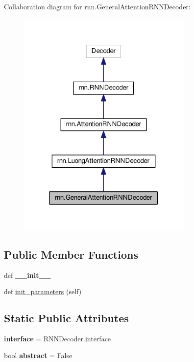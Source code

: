 Collaboration diagram for rnn.\+General\+Attention\+R\+N\+N\+Decoder\+:
\nopagebreak
\begin{figure}[H]
\begin{center}
\leavevmode
\includegraphics[width=245pt]{classrnn_1_1GeneralAttentionRNNDecoder__coll__graph}
\end{center}
\end{figure}
\subsection*{Public Member Functions}
\begin{DoxyCompactItemize}
\item 
def {\bfseries \+\_\+\+\_\+init\+\_\+\+\_\+}\hypertarget{classrnn_1_1GeneralAttentionRNNDecoder_ab29146b7be0f310e74af03e63fee5a0d}{}\label{classrnn_1_1GeneralAttentionRNNDecoder_ab29146b7be0f310e74af03e63fee5a0d}

\item 
def \hyperlink{classrnn_1_1GeneralAttentionRNNDecoder_a396d1ccba6f18aaadfb8cda1a8c2da95}{init\+\_\+parameters} (self)
\end{DoxyCompactItemize}
\subsection*{Static Public Attributes}
\begin{DoxyCompactItemize}
\item 
{\bfseries interface} = R\+N\+N\+Decoder.\+interface\hypertarget{classrnn_1_1GeneralAttentionRNNDecoder_aa2bca36c8dbcd5fa484c57327ccab46c}{}\label{classrnn_1_1GeneralAttentionRNNDecoder_aa2bca36c8dbcd5fa484c57327ccab46c}

\item 
bool {\bfseries abstract} = False\hypertarget{classrnn_1_1GeneralAttentionRNNDecoder_a3047fe7f55a476f80b964747c2dcf0b4}{}\label{classrnn_1_1GeneralAttentionRNNDecoder_a3047fe7f55a476f80b964747c2dcf0b4}

\end{DoxyCompactItemize}
